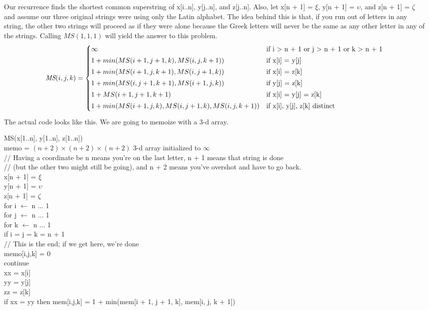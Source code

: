 \documentclass[11pt]{article}
\begin{document}
\begin{solution}
    Our recurrence finds the shortest common superstring of x[i..n], y[j..n], and z[j..n]. Also, let x[n + 1] = $\xi$, y[n + 1] = $\upsilon$, and z[n + 1] = $\zeta$ and assume our three original strings were using only the Latin alphabet. The idea behind this is that, if you run out of letters in any string, the other two strings will proceed as if they were alone because the Greek letters will never be the same as any other letter in any of the strings. Calling $MS(1,1,1)$ will yield the answer to this problem.
    \[
        \emph{MS}(i, j, k) =
        \begin{cases}
            \infty & \text{if i > n + 1 or j > n + 1 or k > n + 1}
            \\[0.5ex]
            1 + min(MS(i + 1, j + 1, k), MS(i, j, k + 1)) & \text{if x[i] = y[j]}
            \\[0.5ex]
            1 + min(MS(i + 1, j, k + 1), MS(i, j + 1, k)) & \text{if x[i] = z[k]}
            \\[0.5ex]
            1 + min(MS(i, j + 1, k + 1), MS(i + 1, j, k)) & \text{if y[j] = z[k]}
            \\[0.5ex]
            1 + MS(i + 1, j + 1, k + 1) & \text{if x[i] = y[j] = z[k]}
            \\[0.5ex]
            1 + min(MS(i + 1, j, k), MS(i, j + 1, k), MS(i, j, k + 1)) & \text{if x[i], y[j], z[k] distinct}
            \\[0.5ex]
        \end{cases}
    \]
    The actual code looks like this. We are going to memoize with a 3-d array.
    \begin{algo}
        MS(x[1..n], y[1..n], z[1..n]) \+
        \\ memo = $(n + 2) \times (n + 2) \times (n + 2)$ 3-d array initialized to $\infty$
        \\ // Having a coordinate be n means you're on the last letter, n + 1 means that string is done
        \\ // (but the other two might still be going), and n + 2 means you've overshot and have to go back.
        \\ x[n + 1] = $\xi$
        \\ y[n + 1] = $\upsilon$
        \\ z[n + 1] = $\zeta$
        \\ for i $\gets$ n $\ldots$ 1 \+
        \\ for j $\gets$ n $\ldots$ 1 \+
        \\ for k $\gets$ n $\ldots$ 1 \+
        \\ if i = j = k = n + 1 \+
        \\ // This is the end; if we get here, we're done
        \\ memo[i,j,k] = 0
        \\ continue \-
        \\ xx = x[i]
        \\ yy = y[j]
        \\ zz = z[k]
        \\ if xx = yy then mem[i,j,k] = 1 + min(mem[i + 1, j + 1, k], mem[i, j, k + 1])


\end{algo}
\end{solution}
\end{document}
